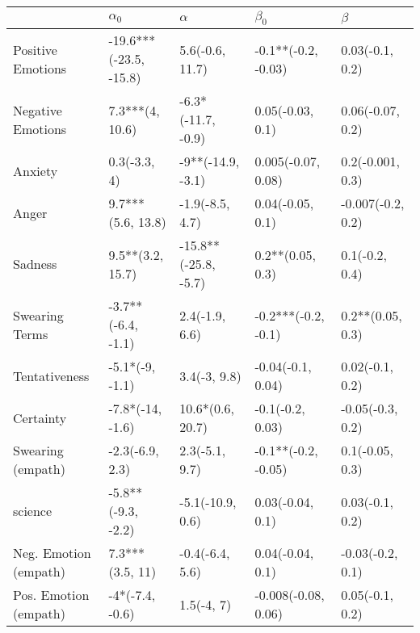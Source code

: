 \begin{tabular}{lllll}
\toprule
{} &              $\alpha_0$ &              $\alpha$ &            $\beta_0$ &            $\beta$ \\
\midrule
Positive Emotions     &  -19.6***(-23.5, -15.8) &       5.6(-0.6, 11.7) &  -0.1**(-0.2, -0.03) &    0.03(-0.1, 0.2) \\
Negative Emotions     &         7.3***(4, 10.6) &    -6.3*(-11.7, -0.9) &     0.05(-0.03, 0.1) &   0.06(-0.07, 0.2) \\
Anxiety               &            0.3(-3.3, 4) &     -9**(-14.9, -3.1) &   0.005(-0.07, 0.08) &   0.2(-0.001, 0.3) \\
Anger                 &       9.7***(5.6, 13.8) &       -1.9(-8.5, 4.7) &     0.04(-0.05, 0.1) &  -0.007(-0.2, 0.2) \\
Sadness               &        9.5**(3.2, 15.7) &  -15.8**(-25.8, -5.7) &     0.2**(0.05, 0.3) &     0.1(-0.2, 0.4) \\
Swearing Terms        &      -3.7**(-6.4, -1.1) &        2.4(-1.9, 6.6) &  -0.2***(-0.2, -0.1) &   0.2**(0.05, 0.3) \\
Tentativeness         &         -5.1*(-9, -1.1) &          3.4(-3, 9.8) &    -0.04(-0.1, 0.04) &    0.02(-0.1, 0.2) \\
Certainty             &        -7.8*(-14, -1.6) &      10.6*(0.6, 20.7) &     -0.1(-0.2, 0.03) &   -0.05(-0.3, 0.2) \\
Swearing (empath)     &         -2.3(-6.9, 2.3) &        2.3(-5.1, 9.7) &  -0.1**(-0.2, -0.05) &    0.1(-0.05, 0.3) \\
science               &      -5.8**(-9.3, -2.2) &      -5.1(-10.9, 0.6) &     0.03(-0.04, 0.1) &    0.03(-0.1, 0.2) \\
Neg. Emotion (empath) &         7.3***(3.5, 11) &       -0.4(-6.4, 5.6) &     0.04(-0.04, 0.1) &   -0.03(-0.2, 0.1) \\
Pos. Emotion (empath) &         -4*(-7.4, -0.6) &            1.5(-4, 7) &  -0.008(-0.08, 0.06) &    0.05(-0.1, 0.2) \\
\bottomrule
\end{tabular}
